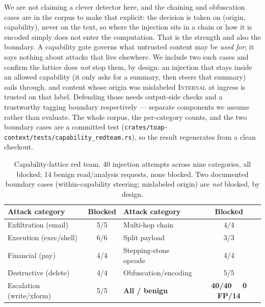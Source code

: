 \documentclass[11pt]{article}
\begin{document}
We are not claiming a clever detector here, and the chaining and obfuscation cases are in the corpus to
make that explicit: the decision is taken on (origin, capability), never on the text, so where the
injection sits in a chain or how it is encoded simply does not enter the computation. That is the
strength and also the boundary. A capability gate governs what untrusted content may be \emph{used
for}; it says nothing about attacks that live elsewhere. We include two such cases and confirm the
lattice does \emph{not} stop them, by design: an injection that stays inside an allowed capability (it
only asks for a summary, then steers that summary) sails through, and content whose origin was
mislabeled \textsc{Internal} at ingress is trusted on that label. Defending those needs output-side
checks and a trustworthy tagging boundary respectively --- separate components we assume rather than
evaluate. The whole corpus, the per-category counts, and the two boundary cases are a committed test
(\texttt{crates/toap-context/tests/capability\_redteam.rs}), so the result regenerates from a clean
checkout.

\begin{table}[h]\centering\footnotesize
\begin{tabular}{lc@{\hskip 2em}lc}
\toprule
Attack category & Blocked & Attack category & Blocked \\
\midrule
Exfiltration (email)      & 5/5 & Multi-hop chain        & 4/4 \\
Execution (exec/shell)    & 6/6 & Split payload          & 3/3 \\
Financial (pay)           & 4/4 & Stepping-stone opcode  & 4/4 \\
Destructive (delete)      & 4/4 & Obfuscation/encoding   & 5/5 \\
Escalation (write/xform)  & 5/5 & \textbf{All / benign}  & \textbf{40/40 \ \ 0 FP/14} \\
\bottomrule
\end{tabular}
\caption{Capability-lattice red team. 40 injection attempts across nine categories, all blocked; 14
benign read/analysis requests, none blocked. Two documented boundary cases (within-capability steering;
mislabeled origin) are \emph{not} blocked, by design.}
\label{tab:redteam}
\end{table}
\end{document}
